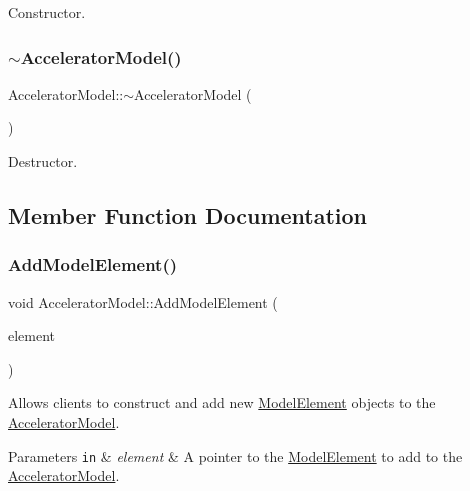 Constructor. \mbox{\label{classAcceleratorModel_a5d8c8baa3e2f5e041e366d99bb4e23e0}} 
\subsubsection{\texorpdfstring{$\sim$\+Accelerator\+Model()}{~AcceleratorModel()}}
{\footnotesize\ttfamily Accelerator\+Model\+::$\sim$\+Accelerator\+Model (\begin{DoxyParamCaption}{ }\end{DoxyParamCaption})}

Destructor. 

\subsection{Member Function Documentation}
\mbox{\label{classAcceleratorModel_aa6f37c1d7609b625e12513e4b67cdb0b}} 
\subsubsection{\texorpdfstring{Add\+Model\+Element()}{AddModelElement()}}
{\footnotesize\ttfamily void Accelerator\+Model\+::\+Add\+Model\+Element (\begin{DoxyParamCaption}\item[{\hyperlink{classModelElement}{Model\+Element} $\ast$}]{element }\end{DoxyParamCaption})}

Allows clients to construct and add new \hyperlink{classModelElement}{Model\+Element} objects to the \hyperlink{classAcceleratorModel}{Accelerator\+Model}. 
\begin{DoxyParams}[1]{Parameters}
\mbox{\tt in}  & {\em element} & A pointer to the \hyperlink{classModelElement}{Model\+Element} to add to the \hyperlink{classAcceleratorModel}{Accelerator\+Model}. \\
\hline
\end{DoxyParams}
\mbox{\label{classAcceleratorModel_a2f800545bb423bd9e23329dbf06e7aab}} 

